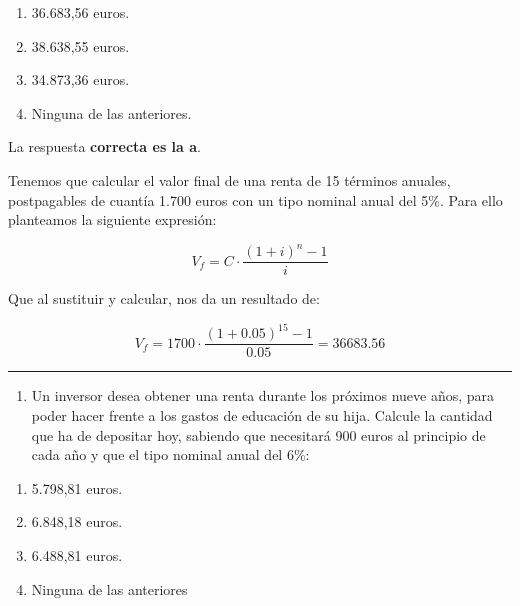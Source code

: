 \documentclass[
  letterpaper,
  DIV=11,
  numbers=noendperiod]{scrreprt}
\providecommand{\tightlist}{%
  \setlength{\itemsep}{0pt}\setlength{\parskip}{0pt}}\usepackage{longtable,booktabs,array}
\begin{document}
\begin{enumerate}
\def\labelenumi{\alph{enumi}.}
\item
  36.683,56 euros.
\item
  38.638,55 euros.
\item
  34.873,36 euros.
\item
  Ninguna de las anteriores.
\end{enumerate}

\begin{tcolorbox}[enhanced jigsaw, left=2mm, opacityback=0, colback=white, breakable, arc=.35mm, bottomrule=.15mm, rightrule=.15mm, toprule=.15mm, leftrule=.75mm, colframe=quarto-callout-tip-color-frame]
\begin{minipage}[t]{5.5mm}
\textcolor{quarto-callout-tip-color}{\faLightbulb}
\end{minipage}%
\begin{minipage}[t]{\textwidth - 5.5mm}

La respuesta \textbf{correcta es la a}.

Tenemos que calcular el valor final de una renta de 15 términos anuales,
postpagables de cuantía 1.700 euros con un tipo nominal anual del 5\%.
Para ello planteamos la siguiente expresión:

\[V_f=C\cdot\frac{\left(1+i\right)^n-1}{i}\]

Que al sustituir y calcular, nos da un resultado de:

\[V_f=1700\cdot\frac{\left(1+0.05\right)^{15}-1}{0.05}=36683.56\]

\end{minipage}%
\end{tcolorbox}

\begin{center}\rule{0.5\linewidth}{0.5pt}\end{center}

\begin{enumerate}
\def\labelenumi{\arabic{enumi}.}
\setcounter{enumi}{85}
\tightlist
\item
  Un inversor desea obtener una renta durante los próximos nueve años,
  para poder hacer frente a los gastos de educación de su hija. Calcule
  la cantidad que ha de depositar hoy, sabiendo que necesitará 900 euros
  al principio de cada año y que el tipo nominal anual del 6\%:
\end{enumerate}

\begin{enumerate}
\def\labelenumi{\alph{enumi}.}
\item
  5.798,81 euros.
\item
  6.848,18 euros.
\item
  6.488,81 euros.
\item
  Ninguna de las anteriores
\end{enumerate}
\end{document}
